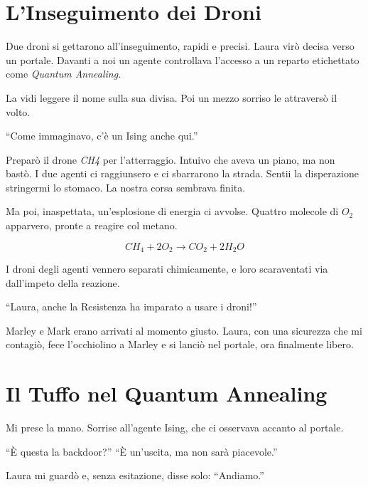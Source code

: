 \section*{L'Inseguimento dei Droni}

Due droni si gettarono all’inseguimento, rapidi e precisi. Laura virò decisa verso un portale. Davanti a noi un agente controllava l’accesso a un reparto etichettato come \textit{Quantum Annealing}.

La vidi leggere il nome sulla sua divisa. Poi un mezzo sorriso le attraversò il volto.

\begin{dialogue}
 \enquote{Come immaginavo, c'è un Ising anche qui.}
\end{dialogue}

Preparò il drone \textit{CH4} per l'atterraggio. Intuivo che aveva un piano, ma non bastò. I due agenti ci raggiunsero e ci sbarrarono la strada. Sentii la disperazione stringermi lo stomaco. La nostra corsa sembrava finita.

Ma poi, inaspettata, un’esplosione di energia ci avvolse. Quattro molecole di \( O_2 \) apparvero, pronte a reagire col metano.

\[
CH_4 + 2O_2 \rightarrow CO_2 + 2H_2O
\]

I droni degli agenti vennero separati chimicamente, e loro scaraventati via dall’impeto della reazione.

\begin{dialogue}
 \enquote{Laura, anche la Resistenza ha imparato a usare i droni!}
\end{dialogue}

Marley e Mark erano arrivati al momento giusto. Laura, con una sicurezza che mi contagiò, fece l’occhiolino a Marley e si lanciò nel portale, ora finalmente libero.

\section{Il Tuffo nel Quantum Annealing}

Mi prese la mano. Sorrise all'agente Ising, che ci osservava accanto al portale.

\begin{dialogue}
 \enquote{È questa la backdoor?}
 \enquote{È un’uscita, ma non sarà piacevole.}
\end{dialogue}

Laura mi guardò e, senza esitazione, disse solo: \enquote{Andiamo.}

